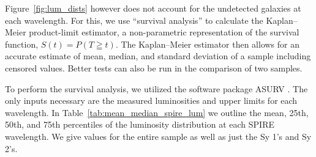 Figure~\ref{fig:lum_dists} however does not account for the undetected galaxies at each wavelength. For this, we use ``survival analysis'' to calculate the Kaplan--Meier product-limit estimator, a non-parametric representation of the survival function, $S(t) = P(T \geqq t)$. The Kaplan--Meier estimator then allows for an accurate estimate of mean, median, and standard deviation of a sample including censored values. Better tests can also be run in the comparison of two samples. 

To perform the survival analysis, we utilized the software package ASURV \citep{Feigelson:1985lr, Isobe:1990fk}. The only inputs necessary are the measured luminosities and upper limits for each wavelength. In Table~\ref{tab:mean_median_spire_lum} we outline the mean, 25th, 50th, and 75th percentiles of the luminosity distribution at each SPIRE wavelength. We give values for the entire sample as well as just the Sy 1's and Sy 2's.